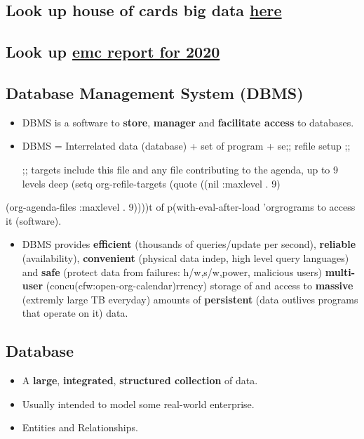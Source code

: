 \documentclass[11pt]{article}
\begin{document}
\subsection{Look up house of cards big data \href{http://wwInternet analyticsw.bigwisdom.net/blog/2016/03/13/4-big-data-lessons-from-house-of-cards/}{here}}
\label{sec:orgfed6146}
\subsection{Look up \href{https://www.emc.com/collateral/analyst-reports/idc-the-digital-universe-in-2020.pdf}{emc report for 2020}}
\label{sec:org2bf3aa6}
\subsection{Database Management System (DBMS)}
\label{sec:orgde62b83}
\begin{itemize}
\item DBMS is a software to \textbf{store}, \textbf{manager} and \textbf{facilitate access} to databases.
\item DBMS = Interrelated data (database) + set of program + se;; refile setup
;;

;; targets include this file and any file contributing to the agenda, up to 9 levels deep
(setq org-refile-targets (quote ((nil :maxlevel . 9)
\end{itemize}
(org-agenda-files :maxlevel . 9))))t of p(with-eval-after-load 'orgrograms to
  access it (software).
\begin{itemize}
\item DBMS provides \textbf{efficient} (thousands of queries/update per second), \textbf{reliable}
(availability), \textbf{convenient} (physical data indep, high level query languages)
and \textbf{safe} (protect data from failures: h/w,s/w,power, malicious users)
\textbf{multi-user} (concu(cfw:open-org-calendar)rrency) storage of and access to \textbf{massive} (extremly large
TB everyday) amounts of \textbf{persistent} (data outlives programs that operate on
it) data.
\end{itemize}
\subsection{Database}
\label{sec:org22cb52f}
\begin{itemize}
\item A \textbf{large}, \textbf{integrated}, \textbf{structured collection} of data.
\item Usually intended to model some real-world enterprise.
\item Entities and Relationships.
\end{itemize}
\end{document}
